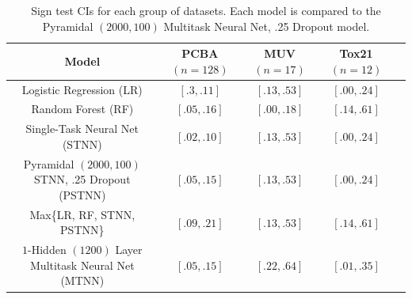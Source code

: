 \begin{table}[ht]
\centering
\caption{Sign test CIs for each group of datasets. Each model is compared
to the Pyramidal $(2000, 100)$ Multitask Neural Net, .25 Dropout model.}
\label{tab:sign-tests}
\vskip 0.2in
\begin{tabular}{ccccc}
\toprule
Model & \makecell{PCBA \\ $(n=128)$} & \makecell{MUV \\ $(n=17)$} & \makecell{Tox21 \\ $(n=12)$} \\
\midrule
Logistic Regression (LR)
& $[.3, .11]$ & $[.13, .53]$ & $[.00, .24]$ \\
Random Forest (RF)
& $[.05, .16]$ & $[.00, .18]$ & $[.14, .61]$ \\
Single-Task Neural Net (STNN)
& $[.02, .10]$ & $[.13, .53]$ & $[.00, .24]$ \\
Pyramidal $(2000, 100)$ STNN, .25 Dropout (PSTNN)
& $[.05, .15]$ & $[.13, .53]$ & $[.00, .24]$ & \\
Max\{LR, RF, STNN, PSTNN\}
& $[.09, .21]$ & $[.13, .53]$ & $[.14, .61]$ & \\
$1$-Hidden $(1200)$ Layer Multitask Neural Net (MTNN)
& $[.05, .15]$ & $[.22, .64]$ & $[.01, .35]$ & \\
\bottomrule
\end{tabular}
\end{table}

